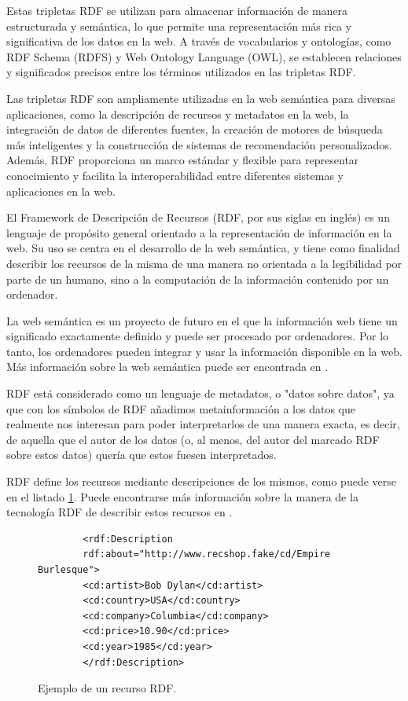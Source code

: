 Estas tripletas RDF se utilizan para almacenar información de manera estructurada y semántica, lo que permite una representación más rica y significativa de los datos en la web. A través de vocabularios y ontologías, como RDF Schema (RDFS) y Web Ontology Language (OWL), se establecen relaciones y significados precisos entre los términos utilizados en las tripletas RDF.

Las tripletas RDF son ampliamente utilizadas en la web semántica para diversas aplicaciones, como la descripción de recursos y metadatos en la web, la integración de datos de diferentes fuentes, la creación de motores de búsqueda más inteligentes y la construcción de sistemas de recomendación personalizados. Además, RDF proporciona un marco estándar y flexible para representar conocimiento y facilita la interoperabilidad entre diferentes sistemas y aplicaciones en la web.

	
El Framework de Descripción de Recursos (RDF, por sus siglas en inglés) es un lenguaje de propósito general orientado a la representación de información en la web. Su uso se centra en el desarrollo de la web semántica, y tiene como finalidad describir los recursos de la misma de una manera no orientada a la legibilidad por parte de un humano, sino a la computación de la información contenido por un ordenador.

La web semántica es un proyecto de futuro en el que la información web tiene un significado exactamente definido y puede ser procesado por ordenadores. Por lo tanto, los ordenadores pueden integrar y usar la información disponible en la web. Más información sobre la web semántica puede ser encontrada en \cite{iswc2007}.

RDF está considerado como un lenguaje de metadatos, o "datos sobre datos", ya que con los símbolos de RDF añadimos metainformación a los datos que realmente nos interesan para poder interpretarlos de una manera exacta, es decir, de aquella que el autor de los datos (o, al menos, del autor del marcado RDF sobre estos datos) quería que estos fuesen interpretados.

RDF define los recursos mediante descripciones de los mismos, como puede verse en el listado \ref{fig:ejemploRDF1}. Puede encontrarse más información sobre la manera de la tecnología RDF de describir estos recursos en \cite{champin2002rdf}.

\begin{figure}[h]
	\centering
	\begin{verbatim}
		<rdf:Description
		rdf:about="http://www.recshop.fake/cd/Empire Burlesque">
		<cd:artist>Bob Dylan</cd:artist>
		<cd:country>USA</cd:country>
		<cd:company>Columbia</cd:company>
		<cd:price>10.90</cd:price>
		<cd:year>1985</cd:year>
		</rdf:Description>
	\end{verbatim}
	\caption{ Ejemplo de un recurso RDF.}
	\label{fig:ejemploRDF1}
\end{figure}


